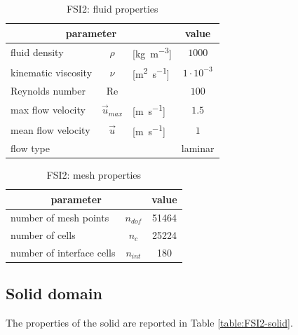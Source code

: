 \begin{table}[!htb]
	\begin{center}
		\begin{tabular}{ l c l | c } 
			\multicolumn{3}{c|}{parameter} & value  \\ 
			\hline
			fluid density  & $\rho$ & [\si{kg.m^{-3}}] & $1000$   \\
			kinematic viscosity & $\nu$& [\si{m^{2}.s^{-1}}] & $1 \cdot 10^{-3}$  \\
			Reynolds number & Re &  & $100$ \\
			max flow velocity & $\vec{u}_{max}$ & [\si{m.s^{-1}}] & $1.5$ \\
			mean flow velocity & $\vec{u}$ & [\si{m.s^{-1}}] & $1$ \\
			flow type & & & laminar \\
		\end{tabular}
	\end{center}
	\caption{FSI2: fluid properties}
	\label{table:FSI2-fluid}
\end{table}



\begin{table}[!htb]
	\begin{center}
		\begin{tabular}{ l c | c } 
			\multicolumn{2}{c|}{parameter} & value   \\ 
			\hline
			number of mesh points  & $n_{dof}$ & 51464     \\
			number of cells & $n_c$ & 25224  \\
			number of interface cells  & $n_{int}$ & 180  \\			
		\end{tabular}
	\end{center}
	\caption{FSI2: mesh properties}
	\label{table:FSI2-mesh}
\end{table}


\subsection{Solid domain}

The properties of the solid are reported in Table \ref{table:FSI2-solid}.

